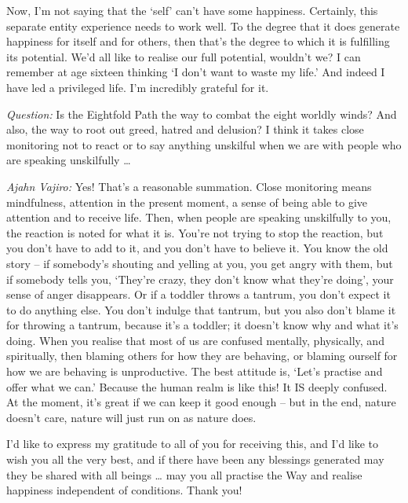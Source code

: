 Now, I'm not saying that the `self' can't have some happiness. Certainly, this
separate entity experience needs to work well. To the degree that it does
generate happiness for itself and for others, then that's the degree to which it
is fulfilling its potential. We'd all like to realise our full potential,
wouldn't we? I can remember at age sixteen thinking `I don't want to waste my
life.' And indeed I have led a privileged life. I'm incredibly grateful for it.

\clearpage

\emph{Question:} Is the Eightfold Path the way to combat the eight worldly winds? And
also, the way to root out greed, hatred and delusion? I think it takes close
monitoring not to react or to say anything unskilful when we are with people who
are speaking unskilfully \ldots{}

\emph{Ajahn Vajiro:} Yes! That's a reasonable summation. Close monitoring means
mindfulness, attention in the present moment, a sense of being able to give
attention and to receive life. Then, when people are speaking unskilfully to
you, the reaction is noted for what it is. You're not trying to stop the
reaction, but you don't have to add to it, and you don't have to believe it. You
know the old story -- if somebody's shouting and yelling at you, you get angry
with them, but if somebody tells you, `They're crazy, they don't know what
they're doing', your sense of anger disappears. Or if a toddler throws a
tantrum, you don't expect it to do anything else. You don't indulge that
tantrum, but you also don't blame it for throwing a tantrum, because it's a
toddler; it doesn't know why and what it's doing. When you realise that most of
us are confused mentally, physically, and spiritually, then blaming others for
how they are behaving, or blaming ourself for how we are behaving is
unproductive. The best attitude is, `Let's practise and offer what we can.'
Because the human realm is like this! It IS deeply confused. At the moment, it's
great if we can keep it good enough -- but in the end, nature doesn't care,
nature will just run on as nature does.

I'd like to express my gratitude to all of you for receiving this, and I'd like
to wish you all the very best, and if there have been any blessings generated
may they be shared with all beings \ldots{} may you all practise the Way and
realise happiness independent of conditions. Thank you!

